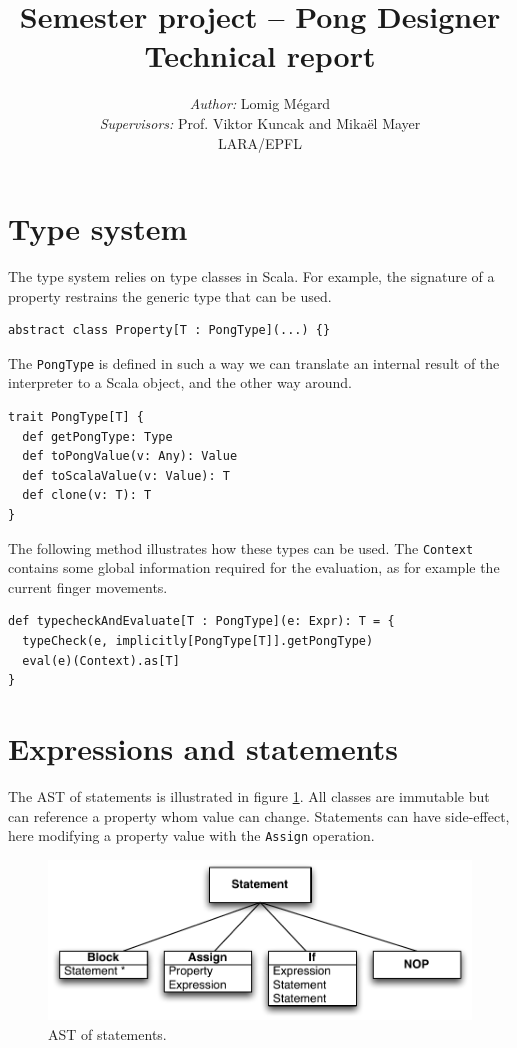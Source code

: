 \documentclass[11pt,a4paper]{article}
\title{Semester project -- Pong Designer\\Technical report}
\author{\textit{Author:} Lomig Mégard\\
\textit{Supervisors:} Prof. Viktor Kuncak and Mikaël Mayer\vspace*{0.5cm}\\
\textsc{LARA/EPFL}}
\begin{document}
\maketitle

\section{Type system}
The type system relies on type classes in Scala. For example, the signature of a property restrains the generic type that can be used.
\begin{lstlisting}
abstract class Property[T : PongType](...) {}
\end{lstlisting}

The \texttt{PongType} is defined in such a way we can translate an internal result of the interpreter to a Scala object, and the other way around.
\begin{lstlisting}
trait PongType[T] {
  def getPongType: Type
  def toPongValue(v: Any): Value
  def toScalaValue(v: Value): T
  def clone(v: T): T
}
\end{lstlisting}

The following method illustrates how these types can be used. The \texttt{Context} contains some global information required for the evaluation, as for example the current finger movements.
\begin{lstlisting}
def typecheckAndEvaluate[T : PongType](e: Expr): T = {
  typeCheck(e, implicitly[PongType[T]].getPongType)
  eval(e)(Context).as[T]
}
\end{lstlisting}

\clearpage
\section{Expressions and statements}
The AST of statements is illustrated in figure \ref{fig:AST-stats}. All classes are immutable but can reference a property whom value can change. Statements can have side-effect, here modifying a property value with the \texttt{Assign} operation. 

\begin{figure}[h]
\centering
\includegraphics[scale = 0.7]{images/AST_stats} 
\caption{AST of statements.}
\label{fig:AST-stats}
\end{figure}
\end{document}

